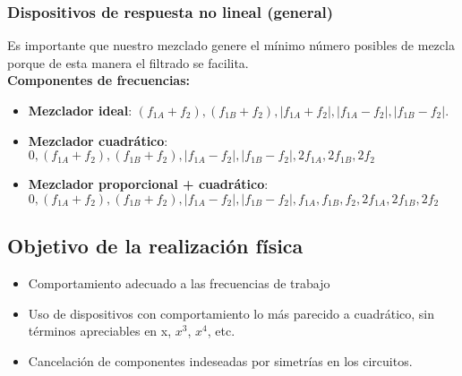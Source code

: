 \documentclass[
	12pt, %
	fleqn, %
	a4paper, %
	oneside, %
]{LegrandOrangeBook}
\begin{document}
\subsubsection*{Dispositivos de respuesta no lineal (general)}
Es importante que nuestro mezclado genere el mínimo número posibles de mezcla porque de esta manera el filtrado se facilita.\\
\textbf{Componentes de frecuencias:}
\begin{itemize}
\item \textbf{Mezclador ideal}: $(f_{1A}+f_2), (f_{1B}+f_2), |f_{1A}+f_2|, |f_{1A}-f_2|, |f_{1B}-f_2|$.
\item \textbf{Mezclador cuadrático}: $0, (f_{1A}+f_2), (f_{1B}+f_2), |f_{1A}-f_2|, |f_{1B}-f_2|, 2f_{1A}, 2f_{1B}, 2f_2$
\item \textbf{Mezclador proporcional + cuadrático}: $0, (f_{1A}+f_2), (f_{1B}+f_2), |f_{1A}-f_2|, |f_{1B}-f_2|, f_{1A}, f_{1B}, f_2, 2f_{1A}, 2f_{1B}, 2f_2$
\end{itemize}
\subsection{Objetivo de la realización física}
\begin{itemize}
\item Comportamiento adecuado a las frecuencias de trabajo
\item Uso de dispositivos con comportamiento lo más parecido a cuadrático, sin términos apreciables en x, $x^3$, $x^4$, etc.
\item Cancelación de componentes indeseadas por simetrías en los circuitos. 
\end{itemize}
\begin{center}
\schema
{
}
{
	\schema
		{
		}
		{
			}
	\schema
		{
		}
		{
			}

} 
\end{center}
\end{document}
